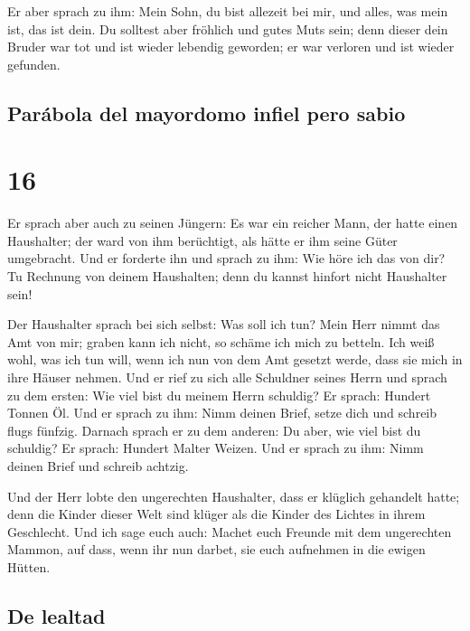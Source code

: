  Er aber sprach zu ihm: Mein Sohn, du bist allezeit bei
mir, und alles, was mein ist, das ist dein.  Du solltest
aber fröhlich und gutes Muts sein; denn dieser dein Bruder war tot und
ist wieder lebendig geworden; er war verloren und ist wieder gefunden.

\hypertarget{paruxe1bola-del-mayordomo-infiel-pero-sabio}{%
\subsection{Parábola del mayordomo infiel pero
sabio}\label{paruxe1bola-del-mayordomo-infiel-pero-sabio}}

\hypertarget{section-15}{%
\section{16}\label{section-15}}

 Er sprach aber auch zu seinen Jüngern: Es war ein reicher
Mann, der hatte einen Haushalter; der ward von ihm berüchtigt, als hätte
er ihm seine Güter umgebracht.  Und er forderte ihn und
sprach zu ihm: Wie höre ich das von dir? Tu Rechnung von deinem
Haushalten; denn du kannst hinfort nicht Haushalter sein!

 Der Haushalter sprach bei sich selbst: Was soll ich tun?
Mein Herr nimmt das Amt von mir; graben kann ich nicht, so schäme ich
mich zu betteln.  Ich weiß wohl, was ich tun will, wenn
ich nun von dem Amt gesetzt werde, dass sie mich in ihre Häuser nehmen.
 Und er rief zu sich alle Schuldner seines Herrn und
sprach zu dem ersten: Wie viel bist du meinem Herrn schuldig?
 Er sprach: Hundert Tonnen Öl. Und er sprach zu ihm: Nimm
deinen Brief, setze dich und schreib flugs fünfzig. 
Darnach sprach er zu dem anderen: Du aber, wie viel bist du schuldig? Er
sprach: Hundert Malter Weizen. Und er sprach zu ihm: Nimm deinen Brief
und schreib achtzig.

 Und der Herr lobte den ungerechten Haushalter, dass er
klüglich gehandelt hatte; denn die Kinder dieser Welt sind klüger als
die Kinder des Lichtes in ihrem Geschlecht.  Und ich sage
euch auch: Machet euch Freunde mit dem ungerechten Mammon, auf dass,
wenn ihr nun darbet, sie euch aufnehmen in die ewigen Hütten.

\hypertarget{de-lealtad}{%
\subsection{De lealtad}\label{de-lealtad}}

